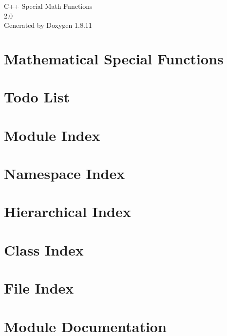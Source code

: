\documentclass[twoside]{book}
\newcommand{\+}{\discretionary{\mbox{\scriptsize$\hookleftarrow$}}{}{}}
\newcommand{\clearemptydoublepage}{%
  \newpage{\pagestyle{empty}\cleardoublepage}%
}
\begin{document}
\hypersetup{pageanchor=false,
             bookmarksnumbered=true,
             pdfencoding=unicode
            }
\begin{titlepage}
\vspace*{7cm}
\begin{center}%
{\Large C++ Special Math Functions \\[1ex]\large 2.\+0 }\\
\vspace*{1cm}
{\large Generated by Doxygen 1.8.11}\\
\end{center}
\end{titlepage}
\clearemptydoublepage
\tableofcontents
\clearemptydoublepage
{}
\hypersetup{pageanchor=true}

\chapter{Mathematical Special Functions}
\label{index}\hypertarget{index}{}
\chapter{Todo List}
\label{todo}
\hypertarget{todo}{}

\chapter{Module Index}

\chapter{Namespace Index}

\chapter{Hierarchical Index}

\chapter{Class Index}

\chapter{File Index}

\chapter{Module Documentation}



\end{document}
